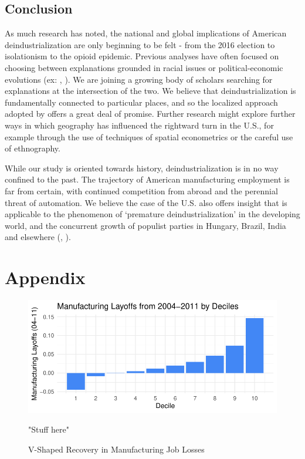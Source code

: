 \documentclass[]{AEA}
\begin{document}
\subsection{Conclusion}

As much research has noted, the national and global implications of
American deindustrialization are only beginning to be felt - from the
2016 election to isolationism to the opioid epidemic. Previous analyses
have often focused on choosing between explanations grounded in racial
issues or political-economic evolutions (ex: \cite{Green19},
\cite{Reny19}). We are joining a growing body of scholars searching for
explanations at the intersection of the two. We believe that
deindustrialization is fundamentally connected to particular places, and
so the localized approach adopted by \cite{Baccini21} offers a great
deal of promise. Further research might explore further ways in which
geography has influenced the rightward turn in the U.S., for example
through the use of techniques of spatial econometrics or the careful use
of ethnography.

While our study is oriented towards history, deindustrialization is in
no way confined to the past. The trajectory of American manufacturing
employment is far from certain, with continued competition from abroad
and the perennial threat of automation. We believe the case of the U.S.
also offers insight that is applicable to the phenomenon of `premature
deindustrialization' in the developing world, and the concurrent growth
of populist parties in Hungary, Brazil, India and elsewhere
(\cite{Rodrik15}, \cite{Castillo16}).

\nocite{Stargazer}




\appendix

\section{Appendix}

\begin{figure} \label{vShapePlot}
\caption{V-Shaped Recovery in Manufacturing Job Losses}

\begin{center}\includegraphics{Final-Draft_files/figure-latex/unnamed-chunk-10-1} \end{center}



\FloatBarrier
\begin{figurenotes}
"Stuff here"
\end{figurenotes}
\end{figure}
\end{document}
